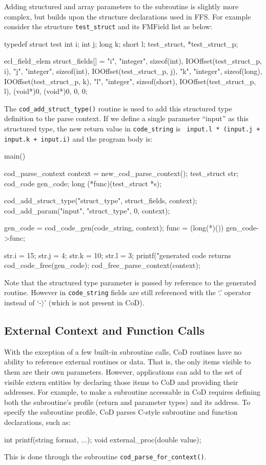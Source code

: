 Adding structured and array parameters to the subroutine is slightly more
complex, but builds upon the structure declarations used in FFS.  For
example consider the structure {\tt test\_struct} and its FMField list
as below:
\begin{Code}
typedef struct test {
    int i;
    int j;
    long k;
    short l;
} test_struct, *test_struct_p;

ecl_field_elem struct_fields[] = {
    {"i", "integer", sizeof(int), IOOffset(test_struct_p, i)},
    {"j", "integer", sizeof(int), IOOffset(test_struct_p, j)},
    {"k", "integer", sizeof(long), IOOffset(test_struct_p, k)},
    {"l", "integer", sizeof(short), IOOffset(test_struct_p, l)},
    {(void*)0, (void*)0, 0, 0}};
\end{Code}

The {\tt cod\_add\_struct\_type()} routine is used to add this structured type
definition to the parse context.  If we define a single parameter ``input'' as
this structured type, the new return value in {\tt code\_string} is {\tt
input.l * (input.j + input.k + input.i)} and the program body is:
\begin{Code}
main() {
    cod_parse_context context = new_cod_parse_context();
    test_struct str;
    cod_code gen_code;
    long (*func)(test_struct *s);

    cod_add_struct_type("struct_type", struct_fields, context);
    cod_add_param("input", "struct_type", 0, context);

    gen_code = cod_code_gen(code_string, context);
    func = (long(*)()) gen_code->func;

    str.i = 15;
    str.j = 4;
    str.k = 10;
    str.l = 3;
    printf("generated code returns %
    cod_code_free(gen_code);
    cod_free_parse_context(context);
}
\end{Code}
Note that the structured type parameter is passed by reference to the
generated routine.  However in {\tt code\_string} fields are still referenced
with the `.' operator instead of `-$\rangle$' (which is not present in CoD).


\subsection{External Context and Function Calls}

With the exception of a few built-in subroutine calls, CoD routines
have no ability to reference external routines or data.  That is, the
only items visible to them are their own parameters.  However,
applications can add to the set of visible extern entities by
declaring those items to CoD and providing their addresses.  For
example, to make a subroutine accessable in CoD requires defining
both  the subroutine's profile (return and parameter types) and its
address.  To specify the subroutine profile, CoD parses C-style
subroutine and function declarations, such as:
\begin{Code}
int printf(string format, ...);
void external_proc(double value);
\end{Code}
This is done through the subroutine {\tt cod\_parse\_for\_context()}.  

